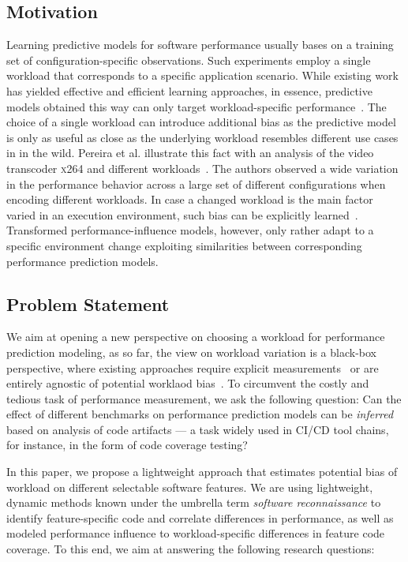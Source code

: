 \documentclass[conference]{IEEEtran}
\begin{document}
\subsection{Motivation}
Learning predictive models for software performance usually bases on a training set of configuration-specific observations. Such experiments employ a single workload that corresponds to a specific application scenario. While existing work has yielded effective and efficient learning approaches, in essence, predictive models obtained this way can only target workload-specific performance~\cite{siegmund_performance-influence_2015,haDeepPerf2019,guo__2013,guo_2018_data,sarkarCostEfficientSamplingPerformance}. The choice of a single workload can introduce additional bias as the predictive model is only as useful as close as the underlying workload resembles different use cases in in the wild. Pereira et al. illustrate this fact with an analysis of the video transcoder \textsc{x264} and different workloads~\cite{alves_sampling_2020}. The authors observed a wide variation in the performance behavior across a large set of different configurations when encoding different workloads. In case a changed workload is the main factor varied in an execution environment, such bias can be explicitly learned~\cite{jamishidi_transfer_2017,jamshidi_learning_2018,jamshidi_transfer_gp_2017,ding_bayesian_2020}. Transformed performance-influence models, however, only rather adapt to a specific environment change exploiting similarities between corresponding performance prediction models.

\subsection{Problem Statement}
We aim at opening a new perspective on choosing a workload for performance prediction modeling, as so far, the view on workload variation is a black-box perspective, where existing approaches require explicit measurements~\cite{jamishidi_transfer_2017,jamshidi_learning_2018,jamshidi_transfer_gp_2017} or are entirely agnostic of potential worklaod bias~\cite{liao_2020_using_emse}. To circumvent the costly and tedious task of performance measurement, we ask the following question: Can the effect of different benchmarks on performance prediction models can be \emph{inferred} based on analysis of code artifacts --- a task widely used in CI/CD tool chains, for instance, in the form of code coverage testing?

In this paper, we propose a lightweight approach that estimates potential bias of workload on different selectable software features. We are using lightweight, dynamic methods known under the umbrella term \emph{software reconnaissance} to identify feature-specific code and correlate differences in performance, as well as modeled performance influence to workload-specific differences in feature code coverage. To this end, we aim at answering the following research questions:
\end{document}
